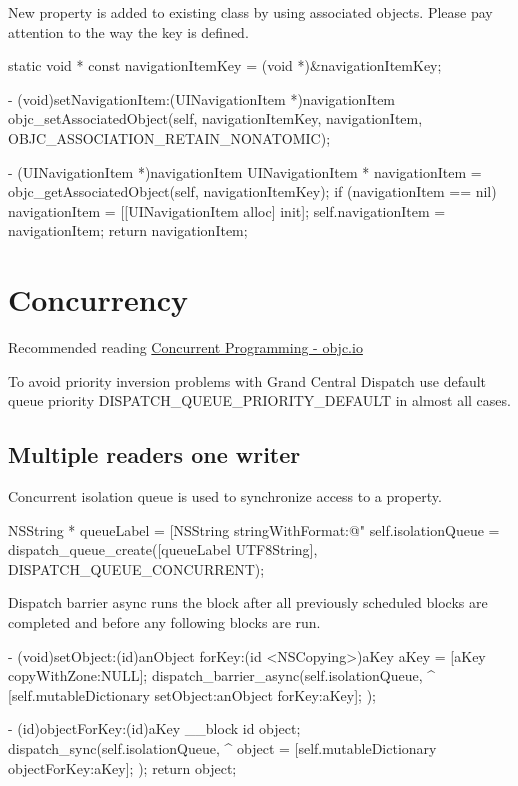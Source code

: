 \documentclass[10pt]{extarticle}
\newenvironment{codelisting}
{\footnotesize\mdframed[middlelinewidth=0.5pt, middlelinecolor=BaliHaiColor, skipabove=15pt]\verbatim}
{\endverbatim\endmdframed\vspace{12pt}\normalsize}
\newenvironment{importantlisting}
{\mdframed[middlelinewidth=0.5pt, middlelinecolor=MatisseColor, skipabove=15pt]{\textbf{Important:}}}
{\endmdframed\vspace{12pt}}
\begin{document}
New property is added to existing class by using associated objects. Please pay attention to the way the key is defined.

\begin{codelisting}
static void * const navigationItemKey = (void *)&navigationItemKey;

- (void)setNavigationItem:(UINavigationItem *)navigationItem
{
    objc_setAssociatedObject(self, 
                             navigationItemKey, 
                             navigationItem, 
                             OBJC_ASSOCIATION_RETAIN_NONATOMIC);
}

- (UINavigationItem *)navigationItem
{
    UINavigationItem * navigationItem = objc_getAssociatedObject(self, navigationItemKey);
    if (navigationItem == nil) {
        navigationItem = [[UINavigationItem alloc] init];
        self.navigationItem = navigationItem;
    }
    return navigationItem;
}
\end{codelisting}


\section{Concurrency}

Recommended reading  \href{http://www.objc.io/issue-2/}{Concurrent Programming - objc.io}

\begin{importantlisting}
To avoid priority inversion problems with Grand Central Dispatch use default queue priority DISPATCH\_QUEUE\_PRIORITY\_DEFAULT in almost all cases.
\end{importantlisting}


\subsection{Multiple readers one writer}

Concurrent isolation queue is used to synchronize access to a property.

\begin{codelisting}
NSString * queueLabel = [NSString stringWithFormat:@"%
self.isolationQueue = dispatch_queue_create([queueLabel UTF8String], DISPATCH_QUEUE_CONCURRENT);
\end{codelisting}

Dispatch barrier async runs the block after all previously scheduled blocks are completed and before any following blocks are run.

\begin{codelisting}
- (void)setObject:(id)anObject forKey:(id <NSCopying>)aKey
{
    aKey = [aKey copyWithZone:NULL];
    dispatch_barrier_async(self.isolationQueue, ^{
        [self.mutableDictionary setObject:anObject forKey:aKey];
    });
}

- (id)objectForKey:(id)aKey
{
    __block id object;
    dispatch_sync(self.isolationQueue, ^{
        object = [self.mutableDictionary objectForKey:aKey];
    });
    return object;
}
\end{codelisting}
\end{document}
